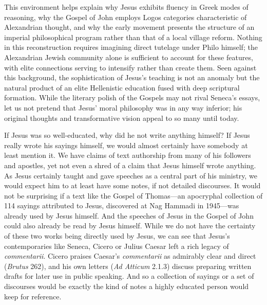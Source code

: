 This environment helps explain why Jesus exhibits fluency in Greek modes of reasoning, why the Gospel of John employs Logos categories characteristic of Alexandrian thought, and why the early movement presents the structure of an imperial philosophical program rather than that of a local village reform.
Nothing in this reconstruction requires imagining direct tutelage under Philo himself; the Alexandrian Jewish community alone is sufficient to account for these features, with elite connections serving to intensify rather than create them.
Seen against this background, the sophistication of Jesus's teaching is not an anomaly but the natural product of an elite Hellenistic education fused with deep scriptural formation.
While the literary polish of the Gospels may not rival Seneca's essays, let us not pretend that Jesus' moral philosophy was in any way inferior; his original thoughts and transformative vision appeal to so many until today.

If Jesus was so well-educated, why did he not write anything himself?
If Jesus really wrote his sayings himself, we would almost certainly have somebody at least mention it.
We have claims of text authorship from many of his followers and apostles, yet not even a shred of a claim that Jesus himself wrote anything.
As Jesus certainly taught and gave speeches as a central part of his ministry, we would expect him to at least have some notes, if not detailed discourses.
It would not be surprising if a text like the Gospel of Thomas---an apocryphal collection of 114 sayings attributed to Jesus, discovered at Nag Hammadi in 1945---was already used by Jesus himself.
And the speeches of Jesus in the Gospel of John could also already be read by Jesus himself.
While we do not have the certainty of these two works being directly used by Jesus, we can see that Jesus's contemporaries like Seneca, Cicero or Julius Caesar left a rich legacy of \textit{commentarii}.
Cicero praises Caesar's \textit{commentarii} as admirably clear and direct (\emph{Brutus} 262), and his own letters (\emph{Ad Atticum} 2.1.3) discuss preparing written drafts for later use in public speaking.
And so a collection of sayings or a set of discourses would be exactly the kind of notes a highly educated person would keep for reference.

